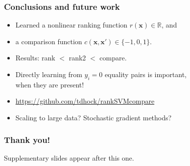 \documentclass{beamer}
\newcommand{\RR}{\mathbb R}
\begin{document}
\begin{frame}
  \frametitle{Conclusions and future work}
  \begin{itemize}
  \item Learned a nonlinear ranking function $r(\mathbf x)\in\RR$, and
  \item a comparison function $c(\mathbf x, \mathbf x')\in\{-1,0,1\}$.
  \item Results: rank $<$ rank2 $<$ compare.
  \item Directly learning from $y_i=0$ equality pairs is important,\\
    when they are present!
  \item \url{https://github.com/tdhock/rankSVMcompare}
  \item Scaling to large data? Stochastic gradient methods?
  \end{itemize}
\end{frame}

\begin{frame}
  \frametitle{Thank you!}
  Supplementary slides appear after this one.
\end{frame}
\end{document}
